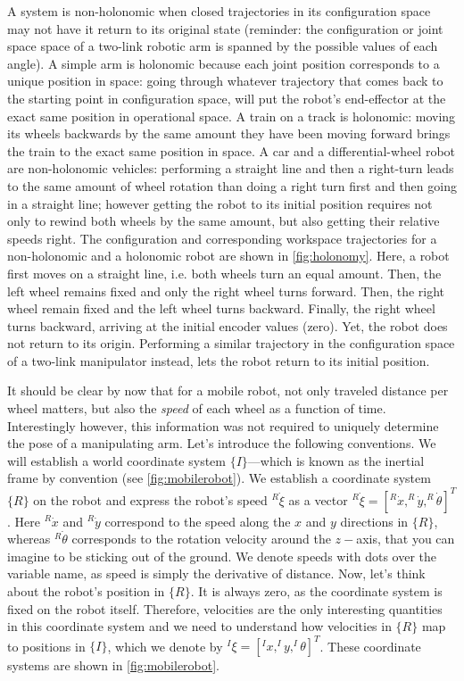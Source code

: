 A system is non-holonomic when closed trajectories in its configuration space may not have it return to its original state (reminder: the configuration or joint space space of a two-link robotic arm is spanned by the possible values of each angle).
A simple arm is holonomic because each joint position corresponds to a unique position in space:
going through whatever trajectory that comes back to the starting point in configuration space, will put the robot's end-effector at the exact same position in operational space.
A train on a track is holonomic: moving its wheels backwards by the same amount they have been moving forward brings the train to the exact same position in space.
A car and a differential-wheel robot are non-holonomic vehicles: performing a straight line and then a right-turn leads to the same amount of wheel rotation than doing a right turn first and then going in a straight line; however getting the robot to its initial position requires not only to rewind both wheels by the same amount, but also getting their relative speeds right.
The configuration and corresponding workspace trajectories for a non-holonomic and a holonomic robot are shown in \cref{fig:holonomy}.
Here, a robot first moves on a straight line, i.e. both wheels turn an equal amount.
Then, the left wheel remains fixed and only the right wheel turns forward.
Then, the right wheel remain fixed and the left wheel turns backward.
Finally, the right wheel turns backward, arriving at the initial encoder values (zero).
Yet, the robot does not return to its origin. Performing a similar trajectory in the configuration space of a two-link manipulator instead, lets the robot return to its initial position.

It should be clear by now that for a mobile robot, not only traveled distance per wheel matters, but also the \textsl{speed} of each wheel as a function of time.
Interestingly however, this information was not required to uniquely determine the pose of a manipulating arm.
Let's introduce the following conventions.
We will establish a world coordinate system $\{I\}$---which is known as the inertial frame by convention (see \cref{fig:mobilerobot}).
We establish a coordinate system $\{R\}$ on the robot and express the robot's speed $^R\dot{\xi}$ as a vector $ ^R\dot{\xi}=[^R\dot{x}, ^R\dot{y}, ^R\dot{\theta}]^T$. Here $^R\dot{x}$ and $^R\dot{y}$ correspond to the speed along the $x$ and $y$ directions in $\{R\}$, whereas $^R\dot{\theta}$ corresponds to the rotation velocity around the $z-$axis, that you can imagine to be sticking out of the ground.
We denote speeds with dots over the variable name, as speed is simply the derivative of distance.
Now, let's think about the robot's position in $\{R\}$. It is always zero, as the coordinate system is fixed on the robot itself.
Therefore, velocities are the only interesting quantities in this coordinate system and we need to understand how velocities in $\{R\}$ map to positions in $\{I\}$, which we denote by $^I\xi=[^Ix, ^Iy, ^I\theta]^T$. These coordinate systems are shown in \cref{fig:mobilerobot}.

